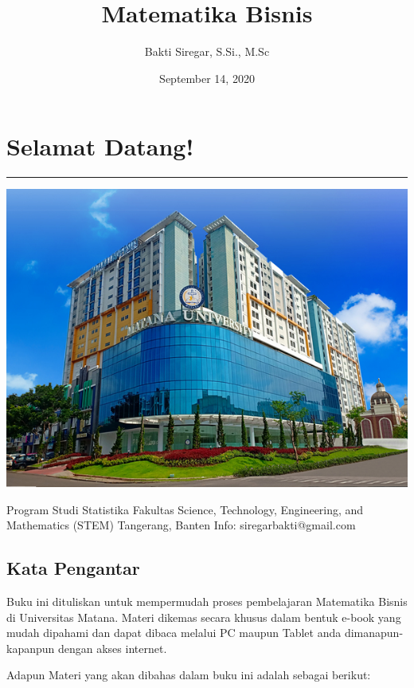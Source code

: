 \documentclass[
]{book}
\title{Matematika Bisnis}
\author{Bakti Siregar, S.Si., M.Sc}
\date{September 14, 2020}
\begin{document}
\maketitle

{
\setcounter{tocdepth}{1}
\tableofcontents
}
\hypertarget{selamat-datang}{%
\chapter*{Selamat Datang!}\label{selamat-datang}}

\begin{center}\rule{0.5\linewidth}{0.5pt}\end{center}

\begin{center}\includegraphics[width=0.5\linewidth]{images/cover} \end{center}

Program Studi Statistika
Fakultas Science, Technology, Engineering, and Mathematics (STEM)
Tangerang, Banten
Info: siregarbakti@gmail.com

\hypertarget{kata-pengantar}{%
\section*{Kata Pengantar}\label{kata-pengantar}}

Buku ini dituliskan untuk mempermudah proses pembelajaran Matematika Bisnis di Universitas Matana. Materi dikemas secara khusus dalam bentuk e-book yang mudah dipahami dan dapat dibaca melalui PC maupun Tablet anda dimanapun-kapanpun dengan akses internet.

Adapun Materi yang akan dibahas dalam buku ini adalah sebagai berikut:
\end{document}
